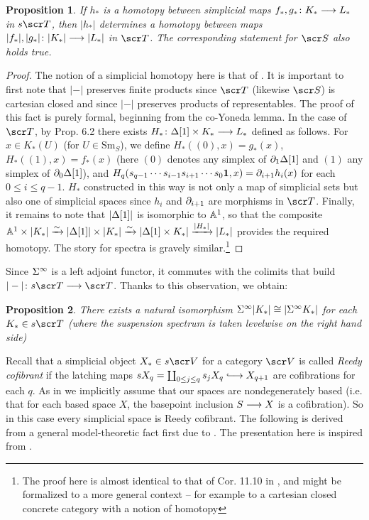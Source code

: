 \documentclass{amsart}
\newtheorem{prop}{Proposition}[section]
\theoremstyle{definition}
\begin{document}
\begin{prop}\label{prop:3.1}
If $h_*$ is a homotopy between simplicial maps $f_*, g_* \colon K_* \longrightarrow L_*$ in $s\sT$, then $|h_*|$ determines a homotopy between maps $|f_*|, |g_*| \colon |K_*| \longrightarrow |L_*|$ in $\sT$. The corresponding statement for $\sS$ also holds true.
\end{prop}
\begin{proof}
The notion of a simplicial homotopy here is that of \cite{may67simpob}. It is important to first note that $|-|$ preserves finite products since $\sT$ (likewise $\sS$) is cartesian closed and since $|-|$ preserves products of representables. The proof of this fact is purely formal, beginning from the co-Yoneda lemma. In the case of $\sT$, by Prop. 6.2 \cite{may67simpob} there exists $H_* \colon \Delta[1] \times K_* \longrightarrow L_*$ defined as follows. For $x \in K_*(U)$ (for $U \in \mathrm{Sm}_S$), we define $H_*((0),x)=g_*(x)$, $H_*((1),x) = f_*(x)$ (here $(0)$ denotes any simplex of $\partial_1\Delta[1]$ and $(1)$ any simplex of $\partial_0\Delta[1]$), and $H_q(s_{q-1} \cdots s_{i-1} s_{i+1} \cdots s_0 \mathbf{1},x) = \partial_{i+1}h_i(x)$ for each $0 \leq i \leq q-1$. $H_*$ constructed in this way is not only a map of simplicial sets but also one of simplicial spaces since $h_i$ and $\partial_{i+1}$ are morphisms in $\sT$. Finally, it remains to note that $|\Delta[1]|$ is isomorphic to $\mathbb{A}^1$, so that the composite $\mathbb{A}^1 \times |K_*| \xrightarrow{\sim} |\Delta[1]| \times |K_*| \xrightarrow{\sim} |\Delta[1] \times K_*| \xrightarrow{|H_*|} |L_*|$ provides the required homotopy. The story for spectra is gravely similar.\footnote{The proof here is almost identical to that of Cor. 11.10 in \cite{May72}, and might be formalized to a more general context -- for example to a cartesian closed concrete category with a notion of homotopy} %
\end{proof}

Since $\Sigma^{\infty}$ is a left adjoint functor, it commutes with the colimits that build $|-| \colon s\sT \rtarr \sT$. Thanks to this observation, we obtain:

\begin{prop}\label{prop:3.2}
There exists a natural isomorphism $\Sigma^{\infty}|K_*| \cong |\Sigma^{\infty}K_*|$ for each $K_* \in s\sT$ (where the suspension spectrum is taken levelwise on the right hand side)
\end{prop}

Recall that a simplicial object $X_* \in s\sV$ for a category $\sV$ is called \emph{Reedy cofibrant} if the latching maps $sX_q = \coprod_{0 \leq j \leq q} s_j X_q \monoto X_{q+1}$ are cofibrations for each $q$. As in \cite{May09Einfty} we implicitly assume that our spaces are nondegenerately based (i.e. that for each based space $X$, the basepoint inclusion $S \longrightarrow X$ is a cofibration). So in this case every simplicial space is Reedy cofibrant. %
The following is derived from a general model-theoretic fact first due to \cite{reedy73}. The presentation here is inspired from \cite{may74perm}. 
\end{document}
